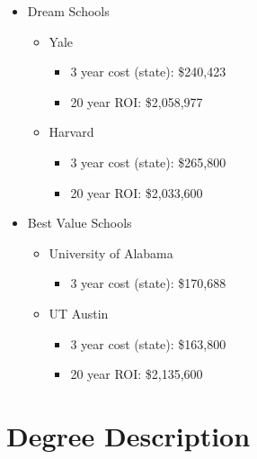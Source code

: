 \begin{itemize}
    \begin{itemize}
        \item{Dream Schools}
            \begin{itemize}
                \item{Yale}
                    \begin{itemize}
                        \item{3 year cost (state):} \$240,423
                        \item{20 year ROI:} \$2,058,977
                    \end{itemize}
                \item{Harvard}
                    \begin{itemize}
                        \item{3 year cost (state):} \$265,800
                        \item{20 year ROI:} \$2,033,600
                    \end{itemize}
            \end{itemize}
        \item{Best Value Schools} 
            \begin{itemize}
                \item{University of Alabama}
                    \begin{itemize}
                        \item{3 year cost (state):} \$170,688 
                    \end{itemize}
                \item{UT Austin}
                    \begin{itemize}
                        \item{3 year cost (state):} \$163,800 
                        \item{20 year ROI:} \$2,135,600 
                    \end{itemize}
            \end{itemize}
    \end{itemize}
\end{itemize}

\section{Degree Description}
